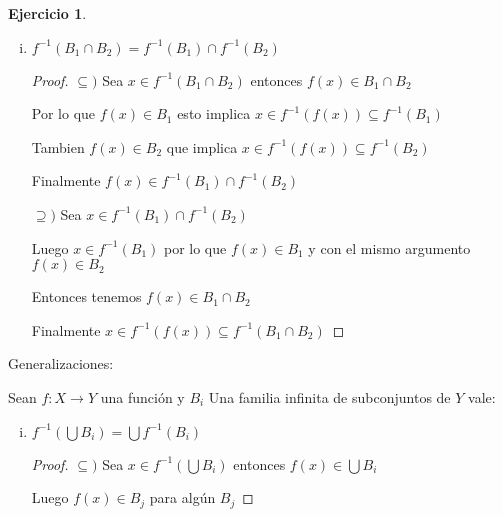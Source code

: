 \documentclass[12pt]{article}
\newcommand{\ra}{\rightarrow}
\theoremstyle{definition}
\newtheorem{ej}{Ejercicio}
\begin{document}
\begin{ej}
\begin{enumerate}[i.]
\begin{proof}
	Sin pérdida de generalidades supongamos  $f(x) \in B_{1}$ 

	Entonces $x \in f^{-1}(f(x)) \subseteq  f^{-1}(B_{1}) \subseteq f^{-1}(B_1) \cup f^{-1}(B_2)$

	Finalmente $x \in f^{-1}(B_{1}) \cup f^{-1}(B_{2})$

        $\supseteq )$ Sea $x \in f^{-1}(B_{1}) \cup f^{-1}(B_{2})$

	Sin pérdida de generalidades supongamos  $x \in f^{-1}(B_{1})$ entonces $f(x) \in B_{1}$

	Por tanto $f(x) \in B_{1} \cup B_{2}$

	Finalmente $x \in f^{-1}(f(x)) \subseteq f^{-1}(B_{1} \cup B_{2})$
      \end{proof}

    \item $f^{-1}(B_{1} \cap B_{2}) = f^{-1}(B_{1}) \cap f^{-1}(B_{2})$
      \begin{proof}
        $\subseteq )$ Sea $x \in f^{-1}(B_{1} \cap B_{2})$ entonces $f(x) \in B_{1} \cap B_{2}$

	Por lo que $f(x) \in B_{1}$ esto implica $x \in f^{-1}(f(x)) \subseteq f^{-1}(B_{1})$

	Tambien $f(x) \in B_{2}$ que implica $x \in f^{-1}(f(x)) \subseteq f^{-1}(B_{2})$

	Finalmente $f(x) \in f^{-1}(B_{1}) \cap f^{-1}(B_{2})$

        $\supseteq )$ Sea $x \in f^{-1}(B_{1}) \cap f^{-1}(B_{2})$

        Luego $x \in f^{-1}(B_{1})$ por lo que $f(x) \in B_{1}$ y con el mismo argumento $f(x) \in B_{2}$

	Entonces tenemos $f(x) \in B_{1} \cap B_{2} $

	Finalmente $x \in f^{-1}(f(x)) \subseteq f^{-1}(B_{1} \cap B_{2})$
      \end{proof}
 \end{enumerate}

Generalizaciones: 

Sean $f: X \ra Y$ una función y $B_{i}$ Una familia infinita de subconjuntos de $Y$ vale:

\begin{enumerate}[i.]
  \item $f^{-1}(\bigcup B_{i}) = \bigcup f^{-1}(B_{i})$
    \begin{proof}
      $\subseteq )$ Sea $x \in f^{-1}(\bigcup B_{i})$ entonces $f(x) \in \bigcup B_{i}$

      Luego $f(x) \in B_{j}$ para algún $B_{j}$


\end{proof}
\end{enumerate}
\end{ej}
\end{document}
